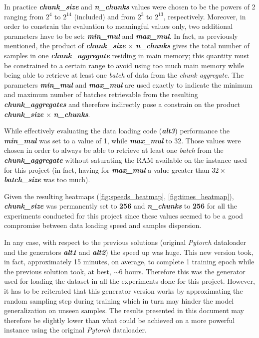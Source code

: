 \documentclass[pdfa%
,cucitura%
]{toptesi}
\begin{document}
In practice \textit{\textbf{chunk\_size}} and \textit{\textbf{n\_chunks}} values were chosen to be the powers of 2 ranging from $2^{4}$ to $2^{14}$ (included) and from $2^{3}$ to $2^{13}$, respectively. Moreover, in order to constrain the evaluation to meaningful values only, two additional parameters have to be set: \textit{\textbf{min\_mul}} and \textit{\textbf{max\_mul}}. In fact, as previously mentioned, the product of \textit{\textbf{chunk\_size}} $\times$ \textit{\textbf{n\_chunks}} gives the total number of samples in one \textit{\textbf{chunk\_aggregate}} residing in main memory; this quantity must be constrained to a certain range to avoid using too much main memory while being able to retrieve at least one \textit{batch} of data from the \textit{chunk aggregate}. The parameters \textit{\textbf{min\_mul}} and \textit{\textbf{max\_mul}} are used exactly to indicate the minimum and maximum number of batches retrievable from the resulting \textit{\textbf{chunk\_aggregates}} and therefore indirectly pose a constrain on the product \textit{\textbf{chunk\_size}} $\times$ \textit{\textbf{n\_chunks}}.

While effectively evaluating the data loading code (\textit{\textbf{alt3}}) performance the \textit{\textbf{min\_mul}} was set to a value of 1, while \textit{\textbf{max\_mul}} to 32. Those values were chosen in order to always be able to retrieve at least one \textit{batch} from the \textit{\textbf{chunk\_aggregate}} without saturating the RAM available on the instance used for this project (in fact, having for \textit{\textbf{max\_mul}} a value greater than $32 \times$ \textit{\textbf{batch\_size}} was too much).

Given the resulting heatmaps (\ref{fig:speeds_heatmap}, \ref{fig:times_heatmap}), \textit{\textbf{chunk\_size}} was permanently set to \textbf{256} and \textit{\textbf{n\_chunks}} to \textbf{256} for all the experiments conducted for this project since these values seemed to be a good compromise between data loading speed and samples dispersion.

In any case, with respect to the previous solutions (original \textit{Pytorch} dataloader and the generators \textit{\textbf{alt1}} and \textit{\textbf{alt2}}) the speed up was huge. This new version took, in fact, approximately 15 minutes, on average, to complete 1 training epoch while the previous solution took, at best, $\sim6$ hours. Therefore this was the generator used for loading the dataset in all the experiments done for this project. However, it has to be reiterated that this generator version works by approximating the random sampling step during training which in turn may hinder the model generalization on unseen samples. The results presented in this document may therefore be slightly lower than what could be achieved on a more powerful instance using the original \textit{Pytorch} dataloader.
\end{document}
